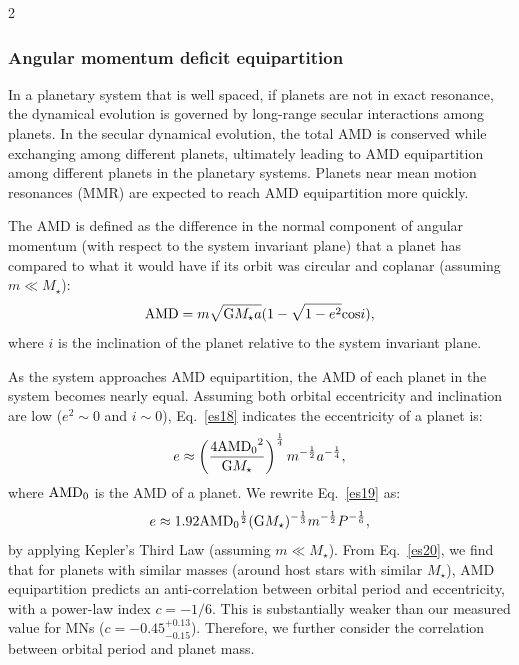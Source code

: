\documentclass[10pt]{article}
\begin{document}
\begin{multicols}{2}
\subsubsection*{\hypertarget{s3.2}{Angular momentum deficit equipartition}}
\noindent In a planetary system that is well spaced, if planets are not in exact resonance, the dynamical evolution is governed by long-range secular interactions among planets.
In the secular dynamical evolution, the total AMD is conserved while exchanging among different planets\cite{1997A&A...317L..75L,2000PhRvL..84.3240L,2017A&A...605A..72L}, ultimately leading to AMD equipartition among different planets in the planetary systems\cite{1989Icar...77..330W,2011ApJ...735..109W,2017A&A...605A..72L}.
Planets near mean motion resonances (MMR) are expected to reach AMD equipartition more quickly\cite{2011ApJ...735..109W}.

The AMD is defined as the difference in the normal component of angular momentum (with respect to the system invariant plane) that a planet has compared to what it would have if its orbit was circular and coplanar (assuming $m \ll M_{\star}$)\cite{2017A&A...605A..72L}:
\begin{equation}
\label{es18}
{\rm AMD}= m \sqrt{{\rm G}M_{\star}a}(1-\sqrt{1-{e}^2}{\rm{cos}}i),
\end{equation}
where $i$ is the inclination of the planet relative to the system invariant plane.

As the system approaches AMD equipartition, the AMD of each planet in the system becomes nearly equal.
Assuming both orbital eccentricity and inclination are low ($e^2\sim0$ and $i\sim0$), Eq.~\ref{es18} indicates the eccentricity of a planet is:
\begin{equation}
\label{es19}
e \approx \left(\frac{4{\rm AMD_0}^2}{{\rm G}M_{\star}} \right)^{\frac{1}{4}} m^{-\frac{1}{2}}a^{-\frac{1}{4}},
\end{equation}
where $\rm AMD_0$ is the AMD of a planet.
We rewrite Eq.~\ref{es19} as:
\begin{equation}
\label{es20}
e \approx 1.92{\rm AMD_0}^{\frac{1}{2}}({{\rm G}M_{\star}})^{-\frac{1}{3}}m^{-\frac{1}{2}}P^{-\frac{1}{6}},
\end{equation}
by applying Kepler's Third Law (assuming $m \ll M_{\star}$).
From Eq.~\ref{es20}, we find that for planets with similar masses (around host stars with similar $M_{\star}$), AMD equipartition predicts an anti-correlation between orbital period and eccentricity, with a power-law index $c=-1/6$.
This is substantially weaker than our measured value for MNs ($c=-0.45^{+0.13}_{-0.15}$).
Therefore, we further consider the correlation between orbital period and planet mass.


\end{multicols}
\end{document}
